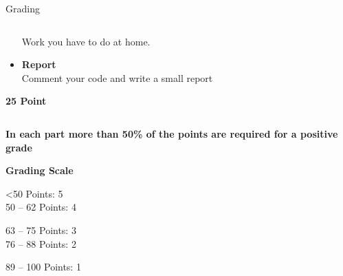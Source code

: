 \documentclass[aspectratio=169]{beamer}
\begin{document}
\begin{frame}{Grading}
\begin{columns}
\begin{column}{0.32\textwidth}
\begin{coloredblock}
\begin{itemize}
                    Work you have to do at home.
                    \item \footnotesize \textbf{Report}\\
                    Comment your code and write a small report
                \end{itemize}
            \end{coloredblock}
            \centering \footnotesize \textbf{25 Point}
        \end{column}
    \end{columns}
    \vspace{0.2cm}
    \begin{coloredblock}[yellow]
        \centering\footnotesize\textbf{In each part more than 50\% of the points are required for a positive grade}
    \end{coloredblock}

    \vspace{0.2cm}
    \begin{coloredblock}[green]
        \begin{minipage}[c]{0.24\textwidth}
            \centering\footnotesize \textbf{Grading Scale}
        \end{minipage}
        \hfill
        \begin{minipage}[c]{0.24\textwidth}
            \footnotesize
            <50 Points:         5\\
            50 – 62 Points:     4
        \end{minipage}
        \hfill
        \begin{minipage}[c]{0.24\textwidth}
            \footnotesize
            63 – 75 Points:     3\\
            76 – 88 Points:     2
        \end{minipage}
        \hfill
        \begin{minipage}[t]{0.24\textwidth}
            \footnotesize
            89 – 100 Points:    1
        \end{minipage}
        
    \end{coloredblock}


\end{frame}
\end{document}
